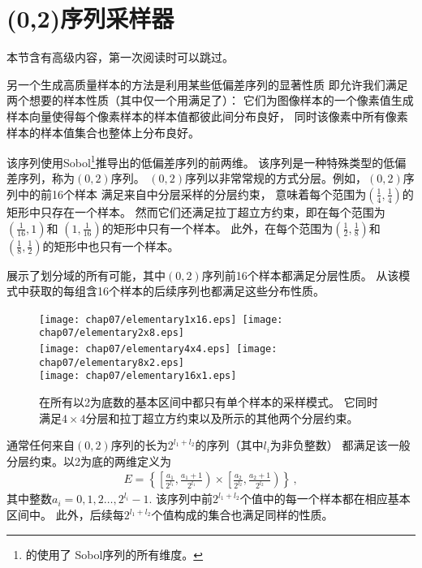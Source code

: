 \section{(0,2)序列采样器}\label{sec:(0,2)序列采样器}
\begin{remark}
    本节含有高级内容，第一次阅读时可以跳过。
\end{remark}

另一个生成高质量样本的方法是利用某些低偏差序列的显著性质
即允许我们满足两个想要的样本性质（其中仅一个用满足了）：
它们为图像样本的一个像素值生成样本向量使得每个像素样本的样本值都彼此间分布良好，
同时该像素中所有像素样本的样本值集合也整体上分布良好。

该序列使用Sobol\footnote{\protect{}的使用了
    Sobol序列的所有维度。}推导出的低偏差序列的前两维。
该序列是一种特殊类型的低偏差序列，称为$(0,2)$序列。
$(0,2)$序列以非常常规的方式分层。例如，$(0,2)$序列中的前16个样本
满足来自中分层采样的分层约束，
意味着每个范围为$\displaystyle\left(\frac{1}{4},\frac{1}{4}\right)$的矩形中只存在一个样本。
然而它们还满足拉丁超立方约束，即在每个范围为$\displaystyle\left(\frac{1}{16},1\right)$和
$\displaystyle\left(1,\frac{1}{16}\right)$的矩形中只有一个样本。
此外，在每个范围为$\displaystyle\left(\frac{1}{2},\frac{1}{8}\right)$和
$\displaystyle\left(\frac{1}{8},\frac{1}{2}\right)$的矩形中也只有一个样本。

展示了划分域的所有可能，其中$(0,2)$序列前16个样本都满足分层性质。
从该模式中获取的每组含16个样本的后续序列也都满足这些分布性质。
\begin{figure}[htbp]
    \texttt{[image: chap07/elementary1x16.eps]}\,
    \texttt{[image: chap07/elementary2x8.eps]}\\
    \texttt{[image: chap07/elementary4x4.eps]}\,
    \texttt{[image: chap07/elementary8x2.eps]}\\
    \texttt{[image: chap07/elementary16x1.eps]}
    \caption{在所有以2为底数的基本区间中都只有单个样本的采样模式。
        它同时满足$4\times4$分层和拉丁超立方约束以及所示的其他两个分层约束。}
    \label{fig:7.28}
\end{figure}

通常任何来自$(0,2)$序列的长为$2^{l_1+l_2}$的序列（其中$l_i$为非负整数）
都满足该一般分层约束。以2为底的两维定义为
\begin{align*}
    E=\left\{\left[\frac{a_1}{2^{l_1}},\frac{a_1+1}{2^{l_1}}\right)\times\left[\frac{a_2}{2^{l_2}},\frac{a_2+1}{2^{l_2}}\right)\right\}\, ,
\end{align*}
其中整数$a_i=0,1,2\ldots,2^{l_i}-1$.
该序列中前$2^{l_1+l_2}$个值中的每一个样本都在相应基本区间中。
此外，后续每$2^{l_1+l_2}$个值构成的集合也满足同样的性质。


